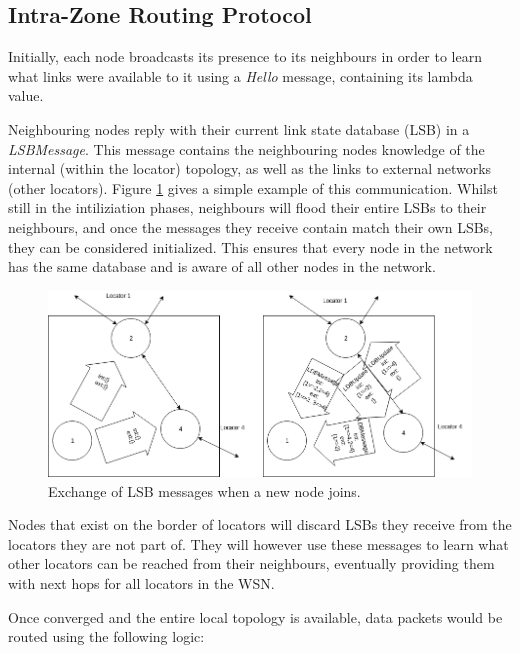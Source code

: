 \documentclass[12pt]{article}
\begin{document}
\subsection{Intra-Zone Routing Protocol}

Initially, each node broadcasts its presence to its neighbours in order to learn what links were available to it using a \emph{Hello} message, containing its lambda value. 

Neighbouring nodes reply with their current link state database (LSB) in a \emph{LSBMessage}. This message contains the neighbouring nodes knowledge of the internal (within the locator) topology, as well as the links to external networks (other locators). Figure \ref{fig:lsbexchange} gives a simple example of this communication. Whilst still in the intiliziation phases, neighbours will flood their entire LSBs to their neighbours, and once the messages they receive contain match their own LSBs, they can be considered initialized. This ensures that every node in the network has the same database and is aware of all other nodes in the network.

\begin{figure}[!ht]
	\centering
	\includegraphics[width=\linewidth]{images/ldb}
	\caption{Exchange of LSB messages when a new node joins.}
	\label{fig:lsbexchange}
\end{figure}

Nodes that exist on the border of locators will discard LSBs they receive from the locators they are not part of. They will however use these messages to learn what other locators can be reached from their neighbours, eventually providing them with next hops for all locators in the WSN.

Once converged and the entire local topology is available, data packets would be routed using the following logic:
\end{document}
